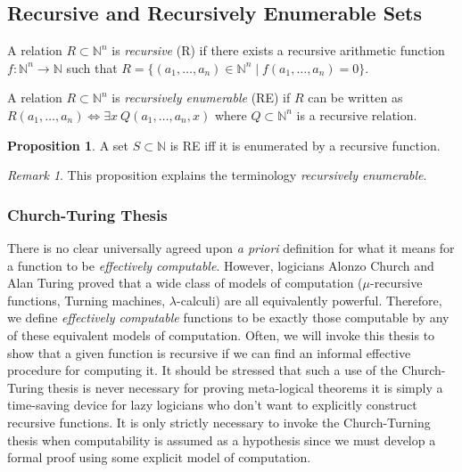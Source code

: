 \documentclass[12pt, leqno]{article}
\newcommand{\N}{\mathbb{N}}
\newcommand{\eq}[1]{\exists{#1} \:}
\newenvironment{definition}[1][Definition:]{\begin{trivlist}
\item[\hskip \labelsep {\bfseries #1}]}{\end{trivlist}}
\theoremstyle{theorem}
\theoremstyle{definition}
\theoremstyle{definition}
\newtheorem*{proposition}{Proposition}
\theoremstyle{remark}
\theoremstyle{definition}
\theoremstyle{remark}
\newtheorem{remark}{Remark}[subsection]
\begin{document}
\subsection{Recursive and Recursively Enumerable Sets}

\begin{definition}
A relation $R \subset \N^n$ is \textit{recursive} (R) if there exists a recursive arithmetic function $f : \N^n \to \N$ such that $R = \{ (a_1, \dots, a_n) \in \N^n \mid f(a_1, \dots, a_n) = 0\}$.
\end{definition}

\begin{definition}
A relation $R \subset \N^n$ is \textit{recursively enumerable} (RE) if $R$ can be written as $R(a_1, \dots, a_n) \iff \eq{x} Q(a_1, \dots, a_n, x)$ where $Q \subset \N^n$ is a recursive relation.
\end{definition}

\begin{proposition}
A set $S \subset \N$ is RE iff it is enumerated by a recursive function.
\end{proposition}

\begin{remark}
This proposition explains the terminology \textit{recursively enumerable}.
\end{remark}

\subsubsection{Church-Turing Thesis}

There is no clear universally agreed upon \textit{a priori} definition for what it means for a function to be \textit{effectively computable}. However, logicians Alonzo Church and Alan Turing proved that a wide class of models of computation ($\mu$-recursive functions, Turning machines, $\lambda$-calculi) are all equivalently powerful. Therefore, we define \textit{effectively computable} functions to be exactly those computable by any of these equivalent models of computation. Often, we will invoke this thesis to show that a given function is recursive if we can find an informal effective procedure for computing it. It should be stressed that such a use of the Church-Turing thesis is never necessary for proving meta-logical theorems it is simply a time-saving device for lazy logicians who don't want to explicitly construct recursive functions. It is only strictly necessary to invoke the Church-Turning thesis when computability is assumed as a hypothesis since we must develop a formal proof using some explicit model of computation. 
  
\end{document}
